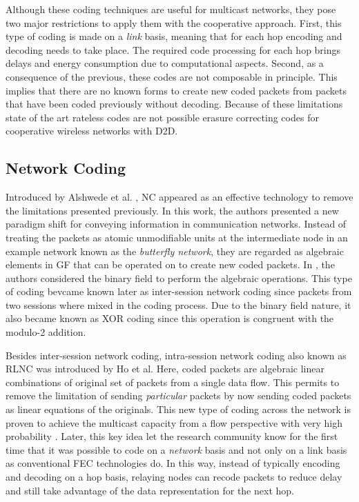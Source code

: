 Although these coding techniques are useful for multicast networks, they pose two major restrictions to apply them with the cooperative approach. First, this type of coding is made on a \textit{link} basis, meaning that for each hop encoding and decoding needs to take place. The required code processing for each hop brings delays and energy consumption due to computational aspects. Second, as a consequence of the previous, these codes are not composable in principle. This implies that there are no known forms to create new coded packets from packets that have been coded previously without decoding. Because of these limitations state of the art rateless codes are not possible erasure correcting codes for cooperative wireless networks with \ac{D2D}.

\subsection{Network Coding}
Introduced by Alshwede et al. \cite{ahlswede2000network}, \ac{NC} appeared as an effective technology to remove the limitations presented previously. In this work, the authors presented a new paradigm shift for conveying information in communication networks. Instead of treating the packets as atomic unmodifiable units at the intermediate node in an example network known as the \textit{butterfly network}, they are regarded as algebraic elements in \ac{GF} that can be operated on to create new coded packets. In \cite{ahlswede2000}, the authors considered the binary field to perform the algebraic operations. This type of coding bevcame known later as inter-session network coding since packets from two sessions where mixed in the coding process. Due to the binary field nature, it also became known as XOR coding since this operation is congruent with the modulo-2 addition.

Besides inter-session network coding, intra-session network coding also known as \ac{RLNC} \cite{ho2006random} was introduced by Ho et al. Here, coded packets are algebraic linear combinations of original set of packets from a single data flow. This permits to remove the limitation of sending \textit{particular} packets by now sending coded packets as linear equations of the originals. This new type of coding across the network is proven to achieve the multicast capacity from a flow perspective with very high probability \cite{koetter2003algebraic,ho2006random}. Later, this key idea let the research community know for the first time that it was possible to code on a \textit{network} basis and not only on a link basis as conventional \ac{FEC} technologies do. In this way, instead of typically encoding and decoding on a hop basis, relaying nodes can recode packets to reduce delay and still take advantage of the data representation for the next hop.

